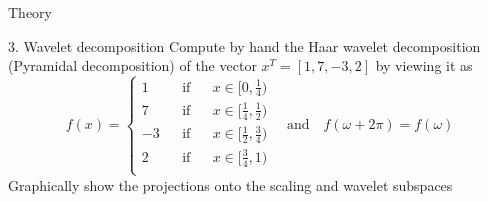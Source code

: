 \begin{section}{Theory}
\begin{homeworkSection}{3. Wavelet decomposition}
Compute by hand the Haar wavelet decomposition (Pyramidal decomposition) of the vector $x^T = [1,7,−3,2]$ by viewing it as
$$
	f(x) = \left \lbrace 
	\begin{matrix} 
		1 && \text{if} && x \in [0,\frac{1}{4}) \\
		7 && \text{if} && x \in [\frac{1}{4}, \frac{1}{2}) \\
		-3 && \text{if} && x \in [\frac{1}{2},\frac{3}{4}) \\
		2 && \text{if} && x \in [\frac{3}{4},1) \\
	 \end{matrix} \right.
	\quad \text{and} \quad f(\omega + 2\pi) = f(\omega)
$$
Graphically show the projections onto the scaling and wavelet subspaces
\\
\\
\problemAnswer{ 
}
\end{homeworkSection}

\end{section}

